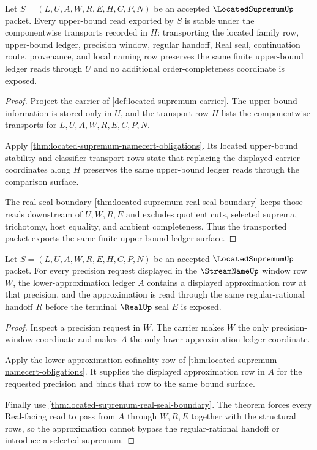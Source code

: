 \begin{theorem}
\label{thm:located-supremum-upper-bound-ledger-stability}
Let $S=(L,U,A,W,R,E,H,C,P,N)$ be an accepted $\LocatedSupremumUp$ packet. Every upper-bound read exported by $S$ is stable under the componentwise transports recorded in $H$: transporting the located family row, upper-bound ledger, precision window, regular handoff, Real seal, continuation route, provenance, and local naming row preserves the same finite upper-bound ledger reads through $U$ and no additional order-completeness coordinate is exposed.
\end{theorem}
\begin{proof}
Project the carrier of \autoref{def:located-supremum-carrier}. The upper-bound information is stored only in $U$, and the transport row $H$ lists the componentwise transports for $L,U,A,W,R,E,C,P,N$.

Apply \autoref{thm:located-supremum-namecert-obligations}. Its located upper-bound stability and classifier transport rows state that replacing the displayed carrier coordinates along $H$ preserves the same upper-bound ledger reads through the comparison surface.

The real-seal boundary \autoref{thm:located-supremum-real-seal-boundary} keeps those reads downstream of $U,W,R,E$ and excludes quotient cuts, selected suprema, trichotomy, host equality, and ambient completeness. Thus the transported packet exports the same finite upper-bound ledger surface.
\end{proof}

\begin{theorem}
\label{thm:located-supremum-lower-approximation-cofinality}
Let $S=(L,U,A,W,R,E,H,C,P,N)$ be an accepted $\LocatedSupremumUp$ packet. For every precision request displayed in the $\StreamNameUp$ window row $W$, the lower-approximation ledger $A$ contains a displayed approximation row at that precision, and the approximation is read through the same regular-rational handoff $R$ before the terminal $\RealUp$ seal $E$ is exposed.
\end{theorem}
\begin{proof}
Inspect a precision request in $W$. The carrier makes $W$ the only precision-window coordinate and makes $A$ the only lower-approximation ledger coordinate.

Apply the lower-approximation cofinality row of \autoref{thm:located-supremum-namecert-obligations}. It supplies the displayed approximation row in $A$ for the requested precision and binds that row to the same bound surface.

Finally use \autoref{thm:located-supremum-real-seal-boundary}. The theorem forces every Real-facing read to pass from $A$ through $W,R,E$ together with the structural rows, so the approximation cannot bypass the regular-rational handoff or introduce a selected supremum.
\end{proof}

